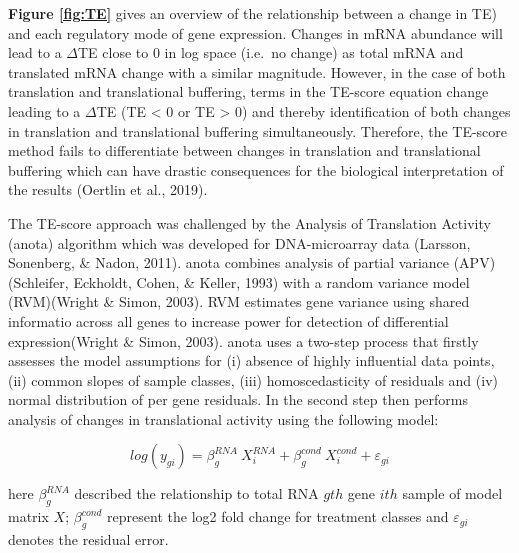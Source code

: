 \documentclass[12pt,openany]{book}
\begin{document}
\textbf{Figure \ref{fig:TE}} gives an overview of the relationship
between a change in TE) and each regulatory mode of gene expression.
Changes in mRNA abundance will lead to a \(\varDelta\)TE close to 0 in
log space (i.e.~no change) as total mRNA and translated mRNA change with
a similar magnitude. However, in the case of both translation and
translational buffering, terms in the TE-score equation change leading
to a \(\varDelta\)TE (TE \textless{} 0 or TE \textgreater{} 0) and
thereby identification of both changes in translation and translational
buffering simultaneously. Therefore, the TE-score method fails to
differentiate between changes in translation and translational buffering
which can have drastic consequences for the biological interpretation of
the results (Oertlin et al., 2019).

The TE-score approach was challenged by the Analysis of Translation
Activity (anota) algorithm which was developed for DNA-microarray data
(Larsson, Sonenberg, \& Nadon, 2011). anota combines analysis of partial
variance (APV)(Schleifer, Eckholdt, Cohen, \& Keller, 1993) with a
random variance model (RVM)(Wright \& Simon, 2003). RVM estimates gene
variance using shared informatio across all genes to increase power for
detection of differential expression(Wright \& Simon, 2003). anota uses
a two-step process that firstly assesses the model assumptions for (i)
absence of highly influential data points, (ii) common slopes of sample
classes, (iii) homoscedasticity of residuals and (iv) normal
distribution of per gene residuals. In the second step then performs
analysis of changes in translational activity using the following model:

\[log(y_{gi}) = \beta_g^{RNA}\ X_i^{RNA}+ \beta_g^{cond}\ X_i^{cond} + \varepsilon_{gi}\]

here \(\beta_g^{RNA}\) described the relationship to total RNA \(gth\)
gene \(ith\) sample of model matrix \(X\); \(\beta_g^{cond}\) represent
the log2 fold change for treatment classes and \(\varepsilon_{gi}\)
denotes the residual error.
\end{document}
